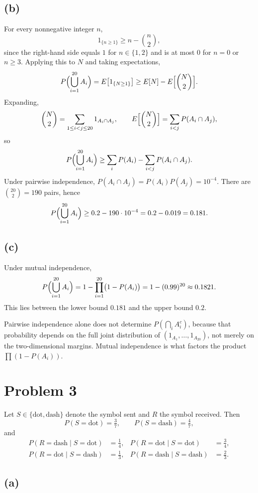 \documentclass[11pt]{article}
\begin{document}
\subsection*{(b)}

For every nonnegative integer $n$,
\[
1_{\{n\ge 1\}} \ge n-\binom{n}{2},
\]
since the right-hand side equals $1$ for $n\in\{1,2\}$ and is at most $0$ for $n=0$ or $n\ge 3$. Applying this to $N$ and taking expectations,
\[
P\Bigl(\bigcup_{i=1}^{20} A_i\Bigr)
= E\bigl[1_{\{N\ge 1\}}\bigr]
\ge E[N]-E\Bigl[\binom{N}{2}\Bigr].
\]
Expanding,
\[
\binom{N}{2}=\sum_{1\le i<j\le 20} 1_{A_i\cap A_j},
\qquad
E\Bigl[\binom{N}{2}\Bigr]=\sum_{i<j} P(A_i\cap A_j),
\]
so
\[
P\Bigl(\bigcup_{i=1}^{20} A_i\Bigr)
\ge \sum_i P(A_i)-\sum_{i<j} P(A_i\cap A_j).
\]
Under pairwise independence, $P(A_i\cap A_j)=P(A_i)P(A_j)=10^{-4}$. There are $\binom{20}{2}=190$ pairs, hence
\[
P\Bigl(\bigcup_{i=1}^{20} A_i\Bigr)
\ge 0.2-190\cdot 10^{-4}=0.2-0.019=0.181.
\]

\subsection*{(c)}

Under mutual independence,
\[
P\Bigl(\bigcup_{i=1}^{20} A_i\Bigr)
= 1-\prod_{i=1}^{20}\bigl(1-P(A_i)\bigr)
= 1-(0.99)^{20}
\approx 0.1821.
\]
This lies between the lower bound $0.181$ and the upper bound $0.2$.

Pairwise independence alone does not determine $P(\bigcap_i A_i^c)$, because that probability depends on the full joint distribution of $(1_{A_1},\ldots,1_{A_{20}})$, not merely on the two-dimensional margins. Mutual independence is what factors the product $\prod(1-P(A_i))$.

\section*{Problem 3}

Let $S\in\{\mathrm{dot},\mathrm{dash}\}$ denote the symbol sent and $R$ the symbol received. Then
\[
P(S=\mathrm{dot})=\tfrac37,\qquad P(S=\mathrm{dash})=\tfrac47,
\]
and
\begin{align*}
P(R=\mathrm{dash}\mid S=\mathrm{dot})&=\tfrac14,
&
P(R=\mathrm{dot}\mid S=\mathrm{dot})&=\tfrac34,\\
P(R=\mathrm{dot}\mid S=\mathrm{dash})&=\tfrac13,
&
P(R=\mathrm{dash}\mid S=\mathrm{dash})&=\tfrac23.
\end{align*}

\subsection*{(a)}
\end{document}
